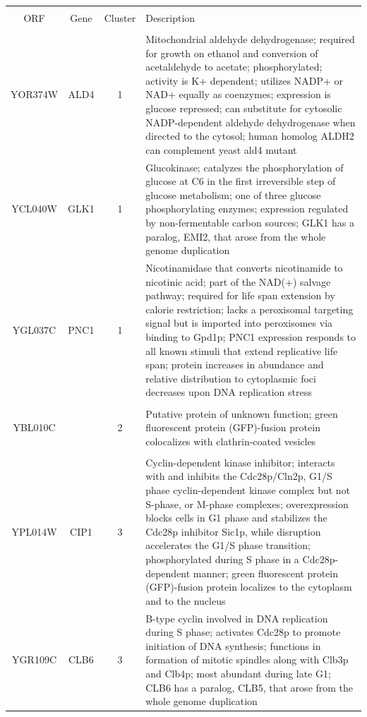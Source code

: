 \documentclass[]{article}
\begin{document}
	\begin{longtable}{@{\extracolsep{3pt}} cccp{85mm}} 
	\\[-1.8ex]\hline 
	\hline \\[-1.8ex] 
		ORF & Gene & Cluster & Description \\ 
		\hline \\[-1.8ex] 
		YOR374W & ALD4 & 1 & Mitochondrial aldehyde dehydrogenase; required for growth on ethanol and conversion of acetaldehyde to acetate; phosphorylated; activity is K+ dependent; utilizes NADP+ or NAD+ equally as coenzymes; expression is glucose repressed; can substitute for cytosolic NADP-dependent aldehyde dehydrogenase when directed to the cytosol; human homolog ALDH2 can complement yeast ald4 mutant \\ 
		YCL040W & GLK1 & 1 & Glucokinase; catalyzes the phosphorylation of glucose at C6 in the first irreversible step of glucose metabolism; one of three glucose phosphorylating enzymes; expression regulated by non-fermentable carbon sources; GLK1 has a paralog, EMI2, that arose from the whole genome duplication \\ 
		YGL037C & PNC1 & 1 & Nicotinamidase that converts nicotinamide to nicotinic acid; part of the NAD(+) salvage pathway; required for life span extension by calorie restriction; lacks a peroxisomal targeting signal but is imported into peroxisomes via binding to Gpd1p; PNC1 expression responds to all known stimuli that extend replicative life span; protein increases in abundance and relative distribution to cytoplasmic foci decreases upon DNA replication stress \\ \hline \\[-1.8ex]
		YBL010C &  & 2 & Putative protein of unknown function; green fluorescent protein (GFP)-fusion protein colocalizes with clathrin-coated vesicles \\ \hline \\[-1.8ex]
		YPL014W & CIP1 & 3 & Cyclin-dependent kinase inhibitor; interacts with and inhibits the Cdc28p/Cln2p, G1/S phase cyclin-dependent kinase complex but not S-phase, or M-phase complexes; overexpression blocks cells in G1 phase and stabilizes the Cdc28p inhibitor Sic1p, while disruption accelerates the G1/S phase transition; phosphorylated during S phase in a Cdc28p-dependent manner; green fluorescent protein (GFP)-fusion protein localizes to the cytoplasm and to the nucleus \\ 
		YGR109C & CLB6 & 3 & B-type cyclin involved in DNA replication during S phase; activates Cdc28p to promote initiation of DNA synthesis; functions in formation of mitotic spindles along with Clb3p and Clb4p; most abundant during late G1; CLB6 has a paralog, CLB5, that arose from the whole genome duplication \\ 

\end{longtable}
\end{document}
